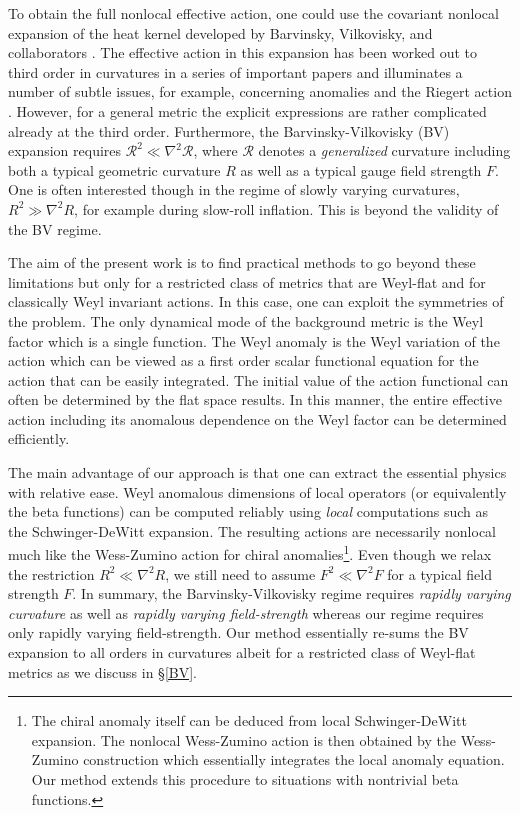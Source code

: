 \documentclass[12pt,a4paper]{article}
\newcommand{\cR}{\mathcal{R}}
\newcommand{\1}{{\textbf{1}}}
\newcommand{\+}{{\,+ \,}}
\begin{document}
To obtain the full nonlocal effective action, one could  use the covariant nonlocal expansion of the heat kernel developed by Barvinsky, Vilkovisky, and collaborators \cite{Barvinsky:1984jd,Barvinsky:1985an}.  The effective action in this expansion has been worked out  to third order in curvatures in a series of important papers \cite{Barvinsky:1988ds,Barvinsky:1994hw,Barvinsky:1994cg,Barvinsky:1995it} and illuminates a number of subtle issues, for example, concerning  anomalies and the Riegert action \cite{Riegert:1984kt,Deser:1996na,Erdmenger:1996yc,Erdmenger:1997gy,Deser:2000un}. However, for a general metric the explicit expressions   are rather complicated already at the third order.  Furthermore,  the Barvinsky-Vilkovisky (BV) expansion requires $\cR^{2} \ll \nabla^{2} \cR  $, where $\cR$ denotes a \textit{generalized} curvature including both a typical geometric curvature $R$  as well as a typical gauge field strength $F$. One is often interested though in the regime of slowly varying curvatures,  $R^{2} \gg \nabla^{2} R$, for example during slow-roll inflation. This is beyond the validity of the BV regime. 

The aim of the present work is to find  practical methods to go beyond these limitations but only for a restricted class of metrics that are Weyl-flat and for classically Weyl invariant actions. In this case, one can exploit the symmetries of the problem.  The only dynamical mode of the background metric is the Weyl factor which is a single function. The Weyl anomaly is the Weyl variation of the action which  can be viewed as  a first order  scalar functional equation for the action that can be easily integrated.  The initial value of the  action functional  can often be  determined by the flat space results. In this manner, the entire effective action including its anomalous dependence on  the Weyl factor  can be determined efficiently. 

The main advantage of our approach is that one can extract  the essential physics with relative ease.  Weyl anomalous dimensions of local operators (or equivalently the beta functions) can be  computed reliably using  \textit{local} computations such as the Schwinger-DeWitt expansion.  The  resulting actions are necessarily nonlocal  much like the Wess-Zumino action for chiral anomalies\footnote{The chiral anomaly itself can be deduced from local Schwinger-DeWitt expansion. The nonlocal Wess-Zumino action is  then obtained by the Wess-Zumino construction which essentially integrates the local anomaly equation. Our method  extends this procedure to situations with nontrivial beta functions.}.  Even though   we relax the restriction $R^{2} \ll \nabla^{2} R $, we still  need to assume $F^{2} \ll \nabla^{2} F  $ for a typical field strength $F$. 
In summary, the Barvinsky-Vilkovisky regime requires \textit{rapidly varying curvature} as well as \textit{rapidly varying field-strength} whereas our regime requires only rapidly varying field-strength.
Our method essentially re-sums the BV  expansion to all orders in curvatures albeit for a restricted class of Weyl-flat metrics as we discuss in \S\ref{BV}. 
 
\end{document}
